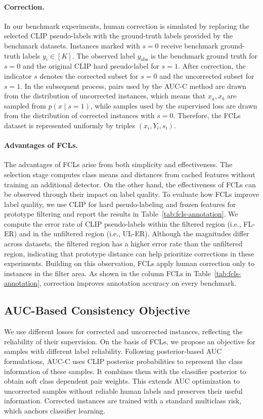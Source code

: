 \documentclass[10pt,twocolumn,letterpaper]{article}
\begin{document}
\paragraph{Correction.}
In our benchmark experiments, human correction is simulated by replacing the selected CLIP pseudo-labels with the ground-truth labels provided by the benchmark datasets. Instances marked with $s=0$ receive benchmark ground-truth labels $y_{i}\in[K]$. The observed label $y_{\mathrm{obs}}$ is the benchmark ground truth for $s=0$ and the original CLIP hard pseudo-label for $s=1$. After correction, the indicator $s$ denotes the corrected subset for $s=0$ and the uncorrected subset for $s=1$. In the subsequent process, pairs used by the AUC-C method are drawn from the distribution of uncorrected instances, which means that $x_{a},x_{b}$ are sampled from $p(x\mid s=1)$, while samples used by the supervised loss are drawn from the distribution of corrected instances with $s=0$. Therefore, the FCLs dataset is represented uniformly by triples $(x_{i},Y_{i},s_{i})$.


\paragraph{Advantages of FCLs.}
The advantages of FCLs arise from both simplicity and effectiveness. The selection stage computes class means and distances from cached features without training an additional detector.  On the other hand, the effectiveness of FCLs can be observed through their impact on label quality. To evaluate how FCLs improve label quality, we use CLIP for hard pseudo-labeling and frozen features for prototype filtering and report the results in Table~\ref{tab:fcls-annotation}. We compute the error rate of CLIP pseudo-labels within the filtered region (i.e., FL-ER) and in the unfiltered region (i.e., UL-ER). Although the magnitudes differ across datasets, the filtered region has a higher error rate than the unfiltered region, indicating that prototype distance can help prioritize corrections in these experiments. Building on this observation, FCLs apply human correction only to instances in the filter area. As shown in the column FCLs in Table~\ref{tab:fcls-annotation}, correction improves annotation accuracy on every benchmark.


\subsection{AUC-Based Consistency Objective}
We use different losses for corrected and uncorrected instances, reflecting the reliability of their supervision.
On the basis of FCLs, we propose an objective for samples with different label reliability. Following posterior-based AUC formulations, AUC-C uses CLIP posterior probabilities to represent the class information of these samples. It combines them with the classifier posterior to obtain soft class dependent pair weights. This extends AUC optimization to uncorrected samples without reliable human labels and preserves their useful information. Corrected instances are trained with a standard multiclass risk, which anchors classifier learning.
\end{document}
